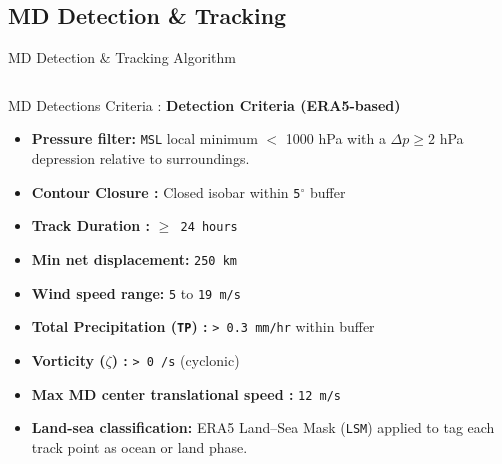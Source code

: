 \documentclass[10pt, aspectratio=169,t,xcolor=table]{beamer}
\begin{document}
\subsection{MD Detection \& Tracking}
\begin{frame}{MD Detection \& Tracking Algorithm}
	\vspace{-0.2cm}
	\begin{columns}[t]
		\begin{block}{\small MD Detections Criteria :}
			\footnotesize
			\textbf{Detection Criteria (ERA5-based)}
			\begin{itemize}
				\item \textbf{Pressure filter:} \texttt{MSL} local minimum $<$ 1000 hPa with a
				      $\Delta p \geq 2$ hPa depression relative to surroundings.
				\item \textbf{Contour Closure :} Closed isobar within \texttt{5$^{\circ}$} buffer
				\item \textbf{Track Duration :} \texttt{$\geq$ 24 hours}
				\item \textbf{Min net displacement:} \texttt{250 km}
				\item \textbf{Wind speed range\footnotemark[1] :} \texttt{5} to \texttt{19 m/s}
				\item \textbf{Total Precipitation (\texttt{TP}) :} \texttt{> 0.3 mm/hr} within buffer
				\item \textbf{Vorticity (\texttt{$\zeta$}) :} \texttt{> 0 /s} (cyclonic)
				\item \textbf{Max MD center translational speed :} \texttt{12 m/s}
				\item \textbf{Land-sea classification:} ERA5 Land–Sea Mask (\texttt{LSM}) applied to
				      tag each track point as ocean or land phase.
			\end{itemize}
		\end{block}

		\vfill


\end{columns}
\end{frame}
\end{document}
